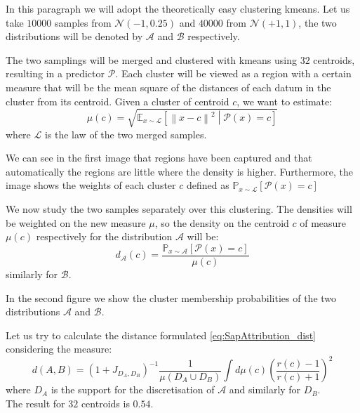 \begin{toReview}
\begin{exempli_gratia}
	In this paragraph we will adopt the theoretically easy clustering \gls{kmeans}. Let us take $\num{10000}$ samples from $\mathcal{N}(-1,0.25)$ and $\num{40000}$ from $\mathcal{N}(+1,1)$, the two distributions will be denoted by $\mathcal{A}$ and $\mathcal{B}$ respectively.

	\noindent The two samplings will be merged and clustered with \gls{kmeans} using $32$ centroids, resulting in a predictor $\mathcal{P}$. Each cluster will be viewed as a region with a certain measure that will be the mean square of the distances of each datum in the cluster from its centroid. Given a cluster of centroid $c$, we want to estimate:
	\[
	\mu(c)=\sqrt{\mathbb{E}_{x\sim\mathcal{L}}\left[\left\|x-c\right\|^2\middle|\mathcal{P}\left(x\right)=c\right]}
	\]
	where $\mathcal{L}$ is the law of the two merged samples.

	\noindent We can see in the first image that regions have been captured and that automatically the regions are little where the density is higher. Furthermore, the image shows the weights of each cluster $c$ defined as  $\mathbb{P}_{x\sim\mathcal{L}}\left[\mathcal{P}(x)=c\right]$

	\noindent We now study the two samples separately over this clustering. The densities will be weighted on the new measure $\mu$, so the density on the centroid $c$ of measure $\mu(c)$ respectively for the distribution $\mathcal{A}$ will be:
	\[
	d_\mathcal{A}(c)=\frac{\mathbb{P}_{x\sim\mathcal{A}}\left[\mathcal{P}(x)=c\right]}{\mu(c)}
	\]
	similarly for $\mathcal{B}$.

	\noindent In the second figure we show the cluster membership probabilities of the two distributions $\mathcal{A}$ and $\mathcal{B}$.

	\noindent Let us try to calculate the distance formulated \cref{eq:SapAttribution_dist} considering the measure:
	\[
	d(A,B)=(1+J_{D_A,D_B})^{-1}\frac{1}{\mu(D_A\cup D_B)}\int d\mu(c) \left(\frac{r(c)-1}{r(c)+1}\right)^2
	\]
	where $D_A$ is the support for the discretisation of ${\mathcal{A}}$ and similarly for $D_B$.\\ The result for $32$ centroids is $0.54$.


\end{exempli_gratia}
\end{toReview}
